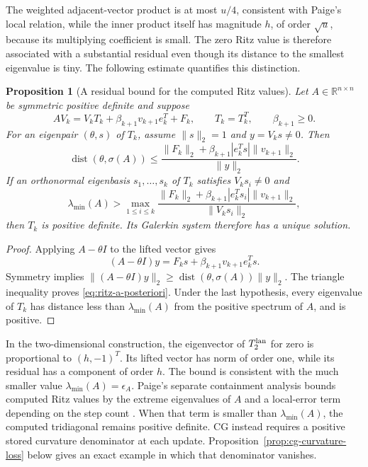\documentclass[11pt]{article}
\newtheorem{proposition}{Proposition}
\theoremstyle{definition}
\newcommand{\R}{\mathbb{R}}
\begin{document}
The weighted adjacent-vector product is at most $u/4$, consistent with
Paige's local relation, while the inner product itself has magnitude
$h$, of order $\sqrt u$, because its multiplying coefficient is small.
The zero Ritz value is therefore associated with a substantial residual
even though its distance to the smallest eigenvalue is tiny.
The following estimate quantifies this distinction.

\begin{proposition}[A residual bound for the computed Ritz values]
\label{prop:singular-T}
Let $A\in\R^{n\times n}$ be symmetric positive definite and suppose
\[
 AV_k=V_kT_k+\beta_{k+1}v_{k+1}e_k^T+F_k,
 \qquad T_k=T_k^T,\qquad \beta_{k+1}\ge0.
\]
For an eigenpair $(\theta,s)$ of $T_k$, assume $\|s\|_2=1$ and
$y=V_ks\ne0$.  Then
\begin{equation}
 \operatorname{dist}(\theta,\sigma(A))
 \le\frac{\|F_k\|_2+\beta_{k+1}|e_k^Ts|\|v_{k+1}\|_2}{\|y\|_2}.
 \label{eq:ritz-a-posteriori}
\end{equation}
If an orthonormal eigenbasis $s_1,\ldots,s_k$ of $T_k$ satisfies
$V_ks_i\ne0$ and
\[
 \lambda_{\min}(A)>
 \max_{1\le i\le k}
 \frac{\|F_k\|_2+\beta_{k+1}|e_k^Ts_i|\|v_{k+1}\|_2}
      {\|V_ks_i\|_2},
\]
then $T_k$ is positive definite.  Its Galerkin system therefore has a
unique solution.
\end{proposition}

\begin{proof}
Applying $A-\theta I$ to the lifted vector gives
\[
 (A-\theta I)y=F_ks+\beta_{k+1}v_{k+1}e_k^Ts.
\]
Symmetry implies
$\|(A-\theta I)y\|_2\ge\operatorname{dist}(\theta,\sigma(A))\|y\|_2$.
The triangle inequality proves \eqref{eq:ritz-a-posteriori}.  Under the
last hypothesis, every eigenvalue of $T_k$ has distance less than
$\lambda_{\min}(A)$ from the positive spectrum of $A$, and is positive.
\end{proof}

In the two-dimensional construction, the eigenvector of $T_2^{\rm lan}$
for zero is proportional to $(h,-1)^T$.  Its lifted vector has norm of
order one, while its residual has a component of order $h$.
The bound is consistent with the much smaller value
$\lambda_{\min}(A)=\epsilon_A$.
Paige's separate containment analysis bounds computed Ritz values by the
extreme eigenvalues of $A$ and a local-error term depending on the step
count \cite{Paige1976,Paige1980}.  When that term is smaller
than $\lambda_{\min}(A)$, the computed tridiagonal remains positive
definite.  CG instead requires a positive stored curvature denominator
at each update.  Proposition~\ref{prop:cg-curvature-loss} below gives
an exact example in which that denominator vanishes.
\end{document}
